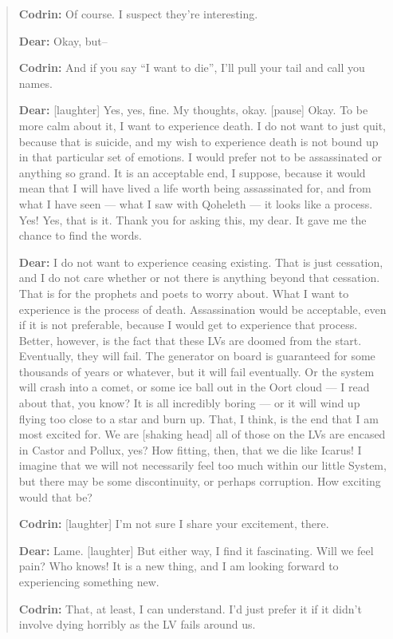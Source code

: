 \begin{quote}
\textbf{Codrin:} Of course. I suspect they're interesting.

\textbf{Dear:} Okay, but--

\textbf{Codrin:} And if you say ``I want to die'', I'll pull your tail and call you names.

\textbf{Dear:} {[}laughter{]} Yes, yes, fine. My thoughts, okay. {[}pause{]} Okay. To be more calm about it, I want to experience death. I do not want to just quit, because that is suicide, and my wish to experience death is not bound up in that particular set of emotions. I would prefer not to be assassinated or anything so grand. It is an acceptable end, I suppose, because it would mean that I will have lived a life worth being assassinated for, and from what I have seen — what I saw with Qoheleth — it looks like a process. Yes! Yes, that is it. Thank you for asking this, my dear. It gave me the chance to find the words.

\textbf{Dear:} I do not want to experience ceasing existing. That is just cessation, and I do not care whether or not there is anything beyond that cessation. That is for the prophets and poets to worry about. What I want to experience is the process of death. Assassination would be acceptable, even if it is not preferable, because I would get to experience that process. Better, however, is the fact that these LVs are doomed from the start. Eventually, they will fail. The generator on board is guaranteed for some thousands of years or whatever, but it will fail eventually. Or the system will crash into a comet, or some ice ball out in the Oort cloud — I read about that, you know? It is all incredibly boring — or it will wind up flying too close to a star and burn up. That, I think, is the end that I am most excited for. We are {[}shaking head{]} all of those on the LVs are encased in Castor and Pollux, yes? How fitting, then, that we die like Icarus! I imagine that we will not necessarily feel too much within our little System, but there may be some discontinuity, or perhaps corruption. How exciting would that be?

\textbf{Codrin:} {[}laughter{]} I'm not sure I share your excitement, there.

\textbf{Dear:} Lame. {[}laughter{]} But either way, I find it fascinating. Will we feel pain? Who knows! It is a new thing, and I am looking forward to experiencing something new.

\textbf{Codrin:} That, at least, I can understand. I'd just prefer it if it didn't involve dying horribly as the LV fails around us.


\end{quote}

